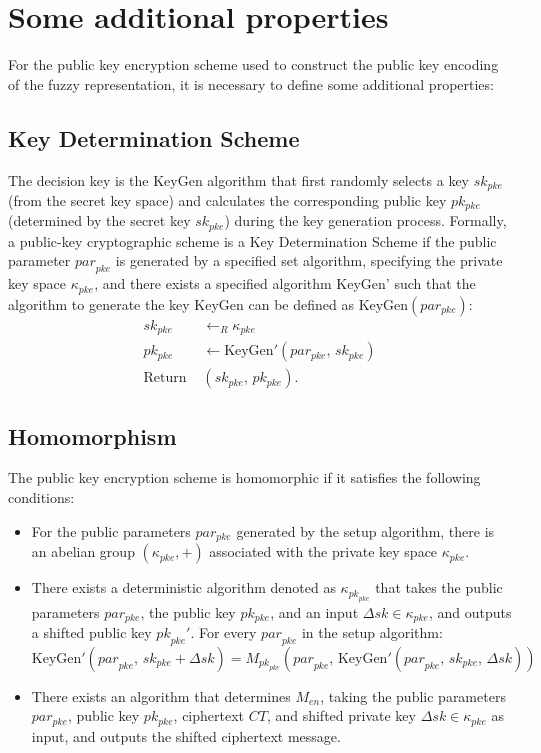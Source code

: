 \documentclass[graybox]{svmult}
\begin{document}
\section{Some additional properties}
For the public key encryption scheme used to construct the public key encoding of the fuzzy representation, it is necessary to define some additional properties:

\subsection{Key Determination Scheme}

The decision key is the KeyGen algorithm that first randomly selects a key \( sk_{pke} \) (from the secret key space) and calculates the corresponding public key \( pk_{pke} \) (determined by the secret key \( {sk}_{pke} \)) during the key generation process. Formally, a public-key cryptographic scheme is a Key Determination Scheme if the public parameter \( {par}_{pke} \) is generated by a specified set algorithm, specifying the private key space \( \kappa_{pke} \), and there exists a specified algorithm KeyGen' such that the algorithm to generate the key KeyGen can be defined as \( \text{KeyGen}(par_{pke}) \):
\begin{align}
    sk_{pke}       & \leftarrow_R \kappa_{pke}                         \\[6pt]
    pk_{pke}       & \leftarrow \text{KeyGen}'(par_{pke}, \, sk_{pke}) \\[6pt]
    \text{Return } & (sk_{pke}, \, pk_{pke}).
\end{align}

\subsection{Homomorphism}

The public key encryption scheme is homomorphic if it satisfies the following conditions:
\begin{itemize}
    \item For the public parameters \( par_{pke} \) generated by the setup algorithm, there is an abelian group \( (\kappa_{pke}, +) \) associated with the private key space \( \kappa_{pke} \).
    \item There exists a deterministic algorithm denoted as \( \kappa_{{pk}_{pke}} \) that takes the public parameters \( par_{pke} \), the public key \( pk_{pke} \), and an input \(\Delta{sk} \in \kappa_{pke} \), and outputs a shifted public key \({pk}_{pke}'\). For every \( {par}_{pke} \) in the setup algorithm:
          {
          \small
          \begin{equation}
              \text{KeyGen}'( {par}_{pke}, \, {sk}_{pke} + \Delta{sk}) = M_{{pk}_{pke}} ({par}_{pke}, \, \text{KeyGen}'({par}_{pke}, \, {sk}_{pke}, \, \Delta{sk}))
          \end{equation}
          }
    \item There exists an algorithm that determines \( M_{en} \), taking the public parameters \( par_{pke} \), public key \( pk_{pke} \), ciphertext \( CT \), and shifted private key \( \Delta sk \in \kappa_{pke} \) as input, and outputs the shifted ciphertext message.
\end{itemize}
\end{document}
